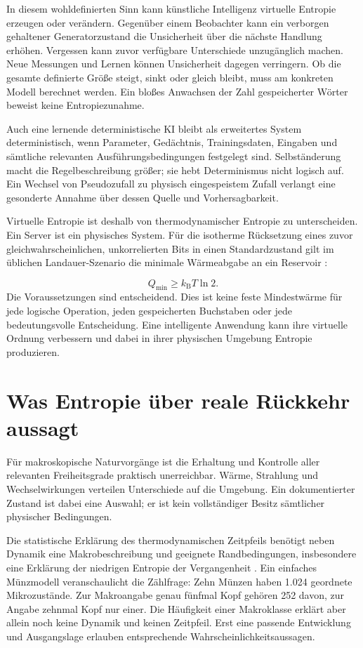 In diesem wohldefinierten Sinn kann künstliche Intelligenz virtuelle Entropie erzeugen oder verändern. Gegenüber einem Beobachter kann ein verborgen gehaltener Generatorzustand die Unsicherheit über die nächste Handlung erhöhen. Vergessen kann zuvor verfügbare Unterschiede unzugänglich machen. Neue Messungen und Lernen können Unsicherheit dagegen verringern. Ob die gesamte definierte Größe steigt, sinkt oder gleich bleibt, muss am konkreten Modell berechnet werden. Ein bloßes Anwachsen der Zahl gespeicherter Wörter beweist keine Entropiezunahme.

Auch eine lernende deterministische KI bleibt als erweitertes System deterministisch, wenn Parameter, Gedächtnis, Trainingsdaten, Eingaben und sämtliche relevanten Ausführungsbedingungen festgelegt sind. Selbständerung macht die Regelbeschreibung größer; sie hebt Determinismus nicht logisch auf. Ein Wechsel von Pseudozufall zu physisch eingespeistem Zufall verlangt eine gesonderte Annahme über dessen Quelle und Vorhersagbarkeit.

Virtuelle Entropie ist deshalb von thermodynamischer Entropie zu unterscheiden. Ein Server ist ein physisches System. Für die isotherme Rücksetzung eines zuvor gleichwahrscheinlichen, unkorrelierten Bits in einen Standardzustand gilt im üblichen Landauer-Szenario die minimale Wärmeabgabe an ein Reservoir \cite{9,18}:

\begin{equation}\label{de:eq5}
Q_{\min}\geq k_{\mathrm B}T\ln 2.
\end{equation}
Die Voraussetzungen sind entscheidend. Dies ist keine feste Mindestwärme für jede logische Operation, jeden gespeicherten Buchstaben oder jede bedeutungsvolle Entscheidung. Eine intelligente Anwendung kann ihre virtuelle Ordnung verbessern und dabei in ihrer physischen Umgebung Entropie produzieren.

\section{Was Entropie über reale Rückkehr aussagt}\label{de:sec5}
Für makroskopische Naturvorgänge ist die Erhaltung und Kontrolle aller relevanten Freiheitsgrade praktisch unerreichbar. Wärme, Strahlung und Wechselwirkungen verteilen Unterschiede auf die Umgebung. Ein dokumentierter Zustand ist dabei eine Auswahl; er ist kein vollständiger Besitz sämtlicher physischer Bedingungen.

Die statistische Erklärung des thermodynamischen Zeitpfeils benötigt neben Dynamik eine Makrobeschreibung und geeignete Randbedingungen, insbesondere eine Erklärung der niedrigen Entropie der Vergangenheit \cite{17}. Ein einfaches Münzmodell veranschaulicht die Zählfrage: Zehn Münzen haben 1.024 geordnete Mikrozustände. Zur Makroangabe genau fünfmal Kopf gehören 252 davon, zur Angabe zehnmal Kopf nur einer. Die Häufigkeit einer Makroklasse erklärt aber allein noch keine Dynamik und keinen Zeitpfeil. Erst eine passende Entwicklung und Ausgangslage erlauben entsprechende Wahrscheinlichkeitsaussagen.

